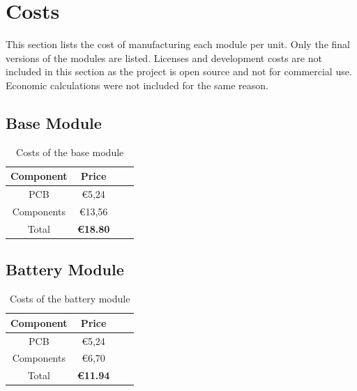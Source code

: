 \section{Costs}
    This section lists the cost of manufacturing each module per unit. Only 
    the final versions of the modules are listed. Licenses and
    development costs are not included in this section as the project
    is open source and not for commercial use. Economic calculations
    were not included for the same reason.


    \subsection{Base Module}
    
        \begin{table}[H]
            \centering
            \begin{tabular}{|c|c|c|c|}
                \hline
                \textbf{Component} & \textbf{Price}  \\
                \hline
                PCB   & €5,24 \\
                \hline
                Components  & €13,56 \\
                \hline
                Total  & \textbf{€18.80} \\
                \hline
            \end{tabular}
            \caption{Costs of the base module}
            \label{tab:costs-base-module}
        \end{table}

    \subsection{Battery Module}
    
        \begin{table}[H]
            \centering
            \begin{tabular}{|c|c|c|c|}
                \hline
                \textbf{Component} & \textbf{Price}  \\
                \hline
                PCB   & €5,24 \\
                \hline
                Components  & €6,70 \\
                \hline
                Total  & \textbf{€11.94} \\
                \hline
            \end{tabular}
            \caption{Costs of the battery module}
            \label{tab:costs-battery-module}
        \end{table}


